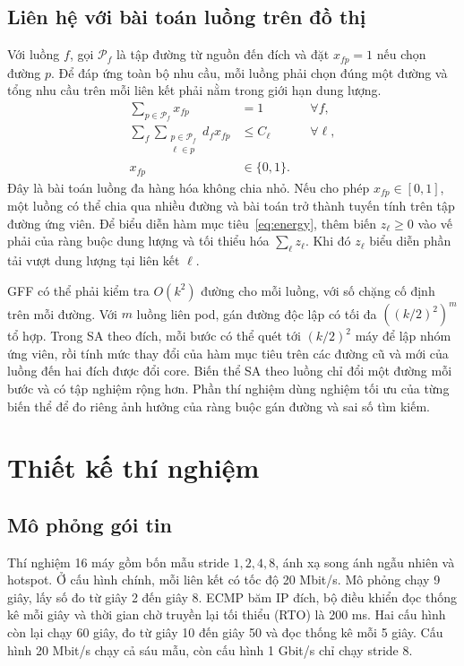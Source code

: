 \documentclass[conference,a4paper]{IEEEtran}
\begin{document}
\subsection{Liên hệ với bài toán luồng trên đồ thị}
Với luồng \(f\), gọi \(\mathcal P_f\) là tập đường từ nguồn đến đích và đặt \(x_{fp}=1\) nếu chọn đường \(p\). Để đáp ứng toàn bộ nhu cầu, mỗi luồng phải chọn đúng một đường và tổng nhu cầu trên mỗi liên kết phải nằm trong giới hạn dung lượng.
\begin{align}
\sum_{p\in\mathcal P_f}x_{fp}&=1 &&\forall f,\\
\sum_{f}\sum_{\substack{p\in\mathcal P_f\\\ell\in p}}
 d_f x_{fp}&\le C_\ell &&\forall \ell,\\[-2pt]
x_{fp}&\in\{0,1\}.
\end{align}
Đây là bài toán luồng đa hàng hóa không chia nhỏ. Nếu cho phép \(x_{fp}\in[0,1]\), một luồng có thể chia qua nhiều đường và bài toán trở thành tuyến tính trên tập đường ứng viên. Để biểu diễn hàm mục tiêu~\eqref{eq:energy}, thêm biến \(z_\ell\ge0\) vào vế phải của ràng buộc dung lượng và tối thiểu hóa \(\sum_\ell z_\ell\). Khi đó \(z_\ell\) biểu diễn phần tải vượt dung lượng tại liên kết \(\ell\).

GFF có thể phải kiểm tra \(O(k^2)\) đường cho mỗi luồng, với số chặng cố định trên mỗi đường. Với \(m\) luồng liên pod, gán đường độc lập có tối đa \(((k/2)^2)^m\) tổ hợp. Trong SA theo đích, mỗi bước có thể quét tới \((k/2)^2\) máy để lập nhóm ứng viên, rồi tính mức thay đổi của hàm mục tiêu trên các đường cũ và mới của luồng đến hai đích được đổi core. Biến thể SA theo luồng chỉ đổi một đường mỗi bước và có tập nghiệm rộng hơn. Phần thí nghiệm dùng nghiệm tối ưu của từng biến thể để đo riêng ảnh hưởng của ràng buộc gán đường và sai số tìm kiếm.

\section{Thiết kế thí nghiệm}
\subsection{Mô phỏng gói tin}
Thí nghiệm 16 máy gồm bốn mẫu stride \(1,2,4,8\), ánh xạ song ánh ngẫu nhiên và hotspot. Ở cấu hình chính, mỗi liên kết có tốc độ 20 Mbit/s. Mô phỏng chạy 9 giây, lấy số đo từ giây 2 đến giây 8. ECMP băm IP đích, bộ điều khiển đọc thống kê mỗi giây và thời gian chờ truyền lại tối thiểu (RTO) là 200 ms. Hai cấu hình còn lại chạy 60 giây, đo từ giây 10 đến giây 50 và đọc thống kê mỗi 5 giây. Cấu hình 20 Mbit/s chạy cả sáu mẫu, còn cấu hình 1 Gbit/s chỉ chạy stride 8.
\end{document}
